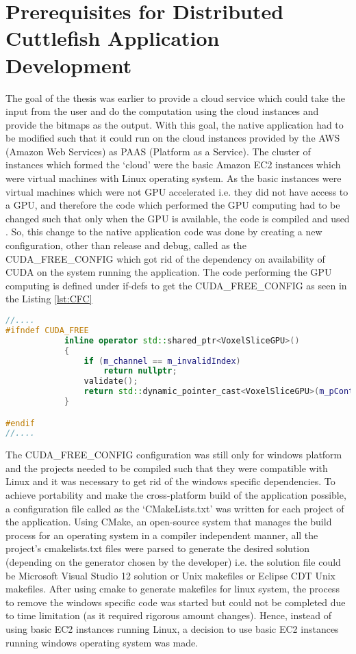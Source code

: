 \section{Prerequisites for Distributed Cuttlefish Application Development} 

The goal of the thesis was earlier to provide a cloud service which could take the input from the user and do the computation using the cloud instances and provide the bitmaps as the output. With this goal, the native application had to be modified such that it could run on the cloud instances provided by the AWS (Amazon Web Services) as PAAS (Platform as a Service). The cluster of instances which formed the {\lq}cloud{\rq} were the basic Amazon EC2 instances which were virtual machines with Linux operating system. As the basic instances were virtual machines which were not GPU accelerated i.e. they did not have access to a GPU, and therefore the code which performed the GPU computing had to be changed such that only when the GPU is available, the code is compiled and used . So, this change to the native application code was done by creating a new configuration, other than release and debug, called as the CUDA\_FREE\_CONFIG which got rid of the dependency on availability of CUDA on the system running the application. The code performing the GPU computing is defined under if-defs to get the CUDA\_FREE\_CONFIG as seen in the Listing \ref{lst:CFC}

\begin{lstlisting}[language=C++,label={lst:CFC},caption={CUDA free configuration}]
//....
#ifndef CUDA_FREE	
			inline operator std::shared_ptr<VoxelSliceGPU>()
			{
				if (m_channel == m_invalidIndex)
					return nullptr;
				validate();
				return std::dynamic_pointer_cast<VoxelSliceGPU>(m_pContainer->m_slices[m_channel][m_slice]);
			}

#endif
//....
\end{lstlisting}

The CUDA\_FREE\_CONFIG configuration was still only for windows platform and the projects needed to be compiled such that they were compatible with Linux and it was necessary to get rid of the windows specific dependencies. To achieve portability and make the cross-platform build of the application possible, a configuration file called as the {\lq}CMakeLists.txt{\rq}  was written for each project of the application. Using CMake, an open-source system that manages the build process for an operating system in a compiler independent manner, all the project's cmakelists.txt files were parsed to generate the desired solution (depending on the generator chosen by the developer) i.e. the solution file could be Microsoft Visual Studio 12 solution or Unix makefiles or Eclipse CDT Unix makefiles. After using cmake to generate makefiles for linux system, the process to remove the windows specific code was started but could not be completed  due to time limitation (as it required rigorous amount changes). Hence, instead of using basic EC2 instances running Linux, a decision to use basic EC2 instances running windows operating system was made.    

